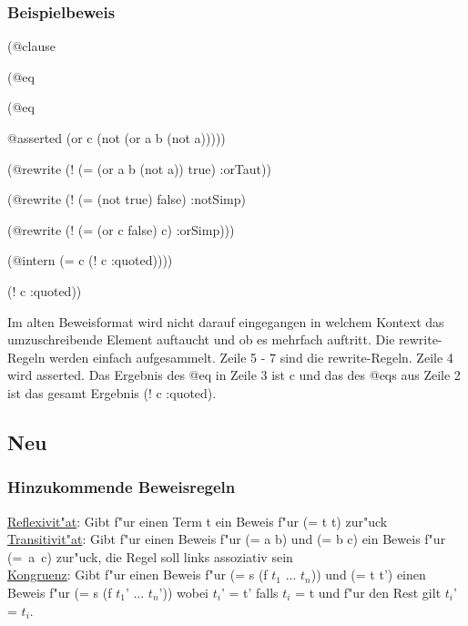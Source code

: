 \documentclass[a4paper]{article}
\begin{document}
\subsubsection{Beispielbeweis}


\begin{list}{\bf Zeile :}{\it}
\item (@clause
\item \hspace*{5mm}(@eq
\item \hspace*{10mm}(@eq
\item \hspace*{15mm}@asserted (or c (not (or a b (not a)))))
\item \hspace*{15mm}(@rewrite (! (= (or a b (not a)) true) :orTaut))
\item \hspace*{15mm}(@rewrite (! (= (not true) false) :notSimp)
\item \hspace*{15mm}(@rewrite (! (= (or c false) c) :orSimp)))
\item \hspace*{10mm}(@intern (= c (! c :quoted))))
\item \hspace*{5mm}(! c :quoted))
\end{list}

Im alten Beweisformat wird nicht darauf eingegangen in welchem Kontext das umzuschreibende Element auftaucht und ob es mehrfach auftritt. Die rewrite-Regeln werden einfach aufgesammelt. Zeile 5 - 7 sind die rewrite-Regeln. Zeile 4 wird asserted. Das Ergebnis des @eq in Zeile 3 ist c und das des @eqs aus Zeile 2 ist das gesamt Ergebnis (! c :quoted).



\subsection{Neu}

\subsubsection{Hinzukommende Beweisregeln}
\uline{Reflexivit"at}: Gibt f"ur einen Term t ein Beweis f"ur (= t t) zur"uck\\
\uline{Transitivit"at}: Gibt f"ur einen Beweis f"ur (= a b) und (= b c) ein Beweis f"ur \mbox{(= a c)} zur"uck, die Regel soll links assoziativ sein\\
\uline{Kongruenz}: Gibt f"ur einen Beweis f"ur (= s (f $t_1$ ... $t_n$)) und (= t t') einen Beweis f"ur (= s (f $t_1$' ... $t_n$')) wobei $t_i$' = t' falls $t_i$ = t und f"ur den Rest gilt $t_i$' = $t_i$.\\
\end{document}
